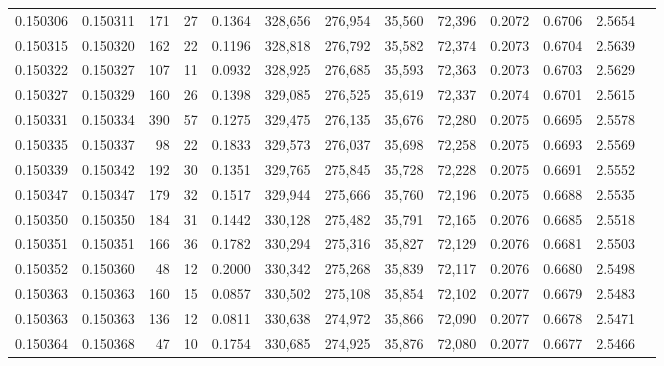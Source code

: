 \begin{tabular}{rrrrrrrrrrrrr}
0.150306 & 0.150311 &   171 &  27 &                                     0.1364 & 328,656 & 276,954 &  35,560 &  72,396 & 0.2072 & 0.6706 & 2.5654 \\
0.150315 & 0.150320 &   162 &  22 &                                     0.1196 & 328,818 & 276,792 &  35,582 &  72,374 & 0.2073 & 0.6704 & 2.5639 \\
0.150322 & 0.150327 &   107 &  11 &                                     0.0932 & 328,925 & 276,685 &  35,593 &  72,363 & 0.2073 & 0.6703 & 2.5629 \\
0.150327 & 0.150329 &   160 &  26 &                                     0.1398 & 329,085 & 276,525 &  35,619 &  72,337 & 0.2074 & 0.6701 & 2.5615 \\
0.150331 & 0.150334 &   390 &  57 &                                     0.1275 & 329,475 & 276,135 &  35,676 &  72,280 & 0.2075 & 0.6695 & 2.5578 \\
0.150335 & 0.150337 &    98 &  22 &                                     0.1833 & 329,573 & 276,037 &  35,698 &  72,258 & 0.2075 & 0.6693 & 2.5569 \\
0.150339 & 0.150342 &   192 &  30 &                                     0.1351 & 329,765 & 275,845 &  35,728 &  72,228 & 0.2075 & 0.6691 & 2.5552 \\
0.150347 & 0.150347 &   179 &  32 &                                     0.1517 & 329,944 & 275,666 &  35,760 &  72,196 & 0.2075 & 0.6688 & 2.5535 \\
0.150350 & 0.150350 &   184 &  31 &                                     0.1442 & 330,128 & 275,482 &  35,791 &  72,165 & 0.2076 & 0.6685 & 2.5518 \\
0.150351 & 0.150351 &   166 &  36 &                                     0.1782 & 330,294 & 275,316 &  35,827 &  72,129 & 0.2076 & 0.6681 & 2.5503 \\
0.150352 & 0.150360 &    48 &  12 &                                     0.2000 & 330,342 & 275,268 &  35,839 &  72,117 & 0.2076 & 0.6680 & 2.5498 \\
0.150363 & 0.150363 &   160 &  15 &                                     0.0857 & 330,502 & 275,108 &  35,854 &  72,102 & 0.2077 & 0.6679 & 2.5483 \\
0.150363 & 0.150363 &   136 &  12 &                                     0.0811 & 330,638 & 274,972 &  35,866 &  72,090 & 0.2077 & 0.6678 & 2.5471 \\
0.150364 & 0.150368 &    47 &  10 &                                     0.1754 & 330,685 & 274,925 &  35,876 &  72,080 & 0.2077 & 0.6677 & 2.5466 \\

\end{tabular}
